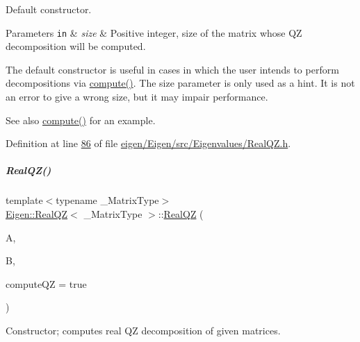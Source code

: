Default constructor. 


\begin{DoxyParams}[1]{Parameters}
\mbox{\tt in}  & {\em size} & Positive integer, size of the matrix whose QZ decomposition will be computed.\\
\hline
\end{DoxyParams}
The default constructor is useful in cases in which the user intends to perform decompositions via \hyperlink{group___eigenvalues___module_a2b6847964d9f1903193cc3e67c196849}{compute()}. The {\ttfamily size} parameter is only used as a hint. It is not an error to give a wrong {\ttfamily size}, but it may impair performance.

\begin{DoxySeeAlso}{See also}
\hyperlink{group___eigenvalues___module_a2b6847964d9f1903193cc3e67c196849}{compute()} for an example. 
\end{DoxySeeAlso}


Definition at line \hyperlink{eigen_2_eigen_2src_2_eigenvalues_2_real_q_z_8h_source_l00086}{86} of file \hyperlink{eigen_2_eigen_2src_2_eigenvalues_2_real_q_z_8h_source}{eigen/\+Eigen/src/\+Eigenvalues/\+Real\+Q\+Z.\+h}.

\mbox{\label{group___eigenvalues___module_ac6e41c839f8dae31c9a3906ea7540119}} 
\subparagraph{\texorpdfstring{Real\+Q\+Z()}{RealQZ()}\hspace{0.1cm}{\footnotesize\ttfamily [2/4]}}
{\footnotesize\ttfamily template$<$typename \+\_\+\+Matrix\+Type$>$ \\
\hyperlink{group___eigenvalues___module_class_eigen_1_1_real_q_z}{Eigen\+::\+Real\+QZ}$<$ \+\_\+\+Matrix\+Type $>$\+::\hyperlink{group___eigenvalues___module_class_eigen_1_1_real_q_z}{Real\+QZ} (\begin{DoxyParamCaption}\item[{const Matrix\+Type \&}]{A,  }\item[{const Matrix\+Type \&}]{B,  }\item[{bool}]{compute\+QZ = {\ttfamily true} }\end{DoxyParamCaption})\hspace{0.3cm}{\ttfamily [inline]}}



Constructor; computes real QZ decomposition of given matrices. 


